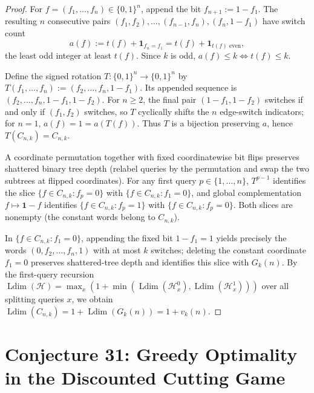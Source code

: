 \documentclass[11pt]{article}
\newcommand{\Ldim}{\operatorname{Ldim}}
\begin{document}
\begin{proof}
For $f = (f_1, \dots, f_n) \in \{0, 1\}^n$, append the bit $f_{n+1} := 1 - f_1$. The resulting $n$ consecutive pairs $(f_1, f_2), \dots, (f_{n-1}, f_n), (f_n, 1 - f_1)$ have switch count
\[
a(f) := t(f) + \mathbf{1}_{f_n = f_1} = t(f) + \mathbf{1}_{t(f)\text{ even}},
\]
the least odd integer at least $t(f)$. Since $k$ is odd, $a(f) \le k \iff t(f) \le k$.

Define the signed rotation $T : \{0, 1\}^n \to \{0, 1\}^n$ by $T(f_1, \dots, f_n) := (f_2, \dots, f_n, 1 - f_1)$. Its appended sequence is $(f_2, \dots, f_n, 1 - f_1, 1 - f_2)$. For $n \ge 2$, the final pair $(1 - f_1, 1 - f_2)$ switches if and only if $(f_1, f_2)$ switches, so $T$ cyclically shifts the $n$ edge-switch indicators; for $n = 1$, $a(f) = 1 = a(T(f))$. Thus $T$ is a bijection preserving $a$, hence $T(C_{n,k}) = C_{n,k}$.

A coordinate permutation together with fixed coordinatewise bit flips preserves shattered binary tree depth (relabel queries by the permutation and swap the two subtrees at flipped coordinates). For any first query $p \in \{1, \dots, n\}$, $T^{p-1}$ identifies the slice $\{f \in C_{n,k} : f_p = 0\}$ with $\{f \in C_{n,k} : f_1 = 0\}$, and global complementation $f \mapsto \mathbf{1} - f$ identifies $\{f \in C_{n,k} : f_p = 1\}$ with $\{f \in C_{n,k} : f_p = 0\}$. Both slices are nonempty (the constant words belong to $C_{n,k}$).

In $\{f \in C_{n,k} : f_1 = 0\}$, appending the fixed bit $1 - f_1 = 1$ yields precisely the words $(0, f_2, \dots, f_n, 1)$ with at most $k$ switches; deleting the constant coordinate $f_1 = 0$ preserves shattered-tree depth and identifies this slice with $G_k(n)$. By the first-query recursion $\Ldim(\mathcal{H}) = \max_{x} (1 + \min(\Ldim(\mathcal{H}_x^0), \Ldim(\mathcal{H}_x^1)))$ over all splitting queries $x$, we obtain $\Ldim(C_{n,k}) = 1 + \Ldim(G_k(n)) = 1 + v_k(n)$.
\end{proof}

\section{Conjecture 31: Greedy Optimality in the Discounted Cutting Game}
\end{document}
